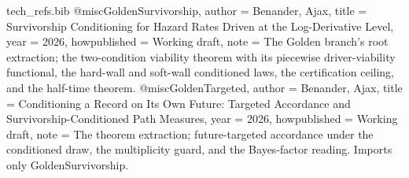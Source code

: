 \begin{filecontents}[overwrite]{tech_refs.bib}
@misc{GoldenSurvivorship,
  author       = {Benander, Ajax},
  title        = {Survivorship Conditioning for Hazard Rates Driven at the Log-Derivative Level},
  year         = {2026},
  howpublished = {Working draft},
  note         = {The Golden branch's root extraction; the two-condition viability
                  theorem with its piecewise driver-viability functional, the
                  hard-wall and soft-wall conditioned laws, the certification
                  ceiling, and the half-time theorem.}
}
@misc{GoldenTargeted,
  author       = {Benander, Ajax},
  title        = {Conditioning a Record on Its Own Future: Targeted Accordance and Survivorship-Conditioned Path Measures},
  year         = {2026},
  howpublished = {Working draft},
  note         = {The theorem extraction; future-targeted accordance under the
                  conditioned draw, the multiplicity guard, and the Bayes-factor
                  reading. Imports only GoldenSurvivorship.}
}


\end{filecontents}
